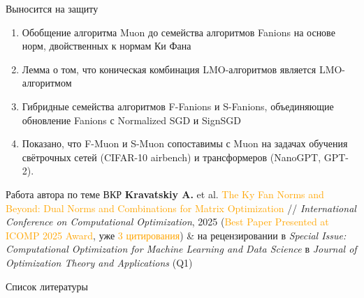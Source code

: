 \documentclass[aspectratio=43]{beamer}
\begin{document}
\begin{frame}{Выносится на защиту}
    \begin{enumerate}
        \item Обобщение алгоритма Muon до семейства алгоритмов Fanions на основе норм, двойственных к нормам Ки Фана
        \item Лемма о том, что коническая комбинация LMO-алгоритмов является LMO-алгоритмом
        \item Гибридные семейства алгоритмов F-Fanions и S-Fanions, объединяющие обновление Fanions с Normalized SGD и SignSGD
        \item Показано, что F-Muon и S-Muon сопоставимы с Muon на задачах обучения свётрочных сетей (CIFAR-10 airbench) и трансформеров (NanoGPT, GPT-2).
    \end{enumerate}
    \begin{block}{Работа автора по теме ВКР}
        \textbf{Kravatskiy A.} et al. \textcolor{orange}{The Ky Fan Norms and Beyond: Dual Norms and Combinations for Matrix Optimization} // \emph{International Conference on Computational Optimization}, 2025 (\textcolor{orange}{Best Paper Presented at ICOMP 2025 Award}, уже \textcolor{orange}{3 цитирования}) \& на рецензировании в \emph{Special Issue: Computational Optimization for Machine Learning and Data Science} в \emph{Journal of Optimization Theory and Applications} (Q1) 
    \end{block}
\end{frame}

\begin{frame}[allowframebreaks]{Список литературы}
  \printbibliography
\end{frame}
\end{document}
